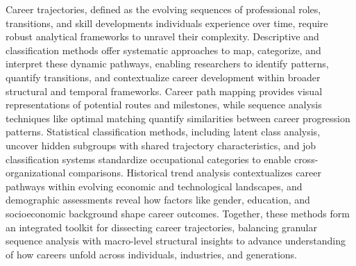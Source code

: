 \documentclass[./main.tex]{subfiles}
\begin{document}
Career trajectories, defined as the evolving sequences of professional roles, transitions, and skill developments individuals experience over time, require robust analytical frameworks to unravel their complexity. Descriptive and classification methods offer systematic approaches to map, categorize, and interpret these dynamic pathways, enabling researchers to identify patterns, quantify transitions, and contextualize career development within broader structural and temporal frameworks. Career path mapping provides visual representations of potential routes and milestones, while sequence analysis techniques like optimal matching quantify similarities between career progression patterns. Statistical classification methods, including latent class analysis, uncover hidden subgroups with shared trajectory characteristics, and job classification systems standardize occupational categories to enable cross-organizational comparisons. Historical trend analysis contextualizes career pathways within evolving economic and technological landscapes, and demographic assessments reveal how factors like gender, education, and socioeconomic background shape career outcomes. Together, these methods form an integrated toolkit for dissecting career trajectories, balancing granular sequence analysis with macro-level structural insights to advance understanding of how careers unfold across individuals, industries, and generations.
\end{document}
